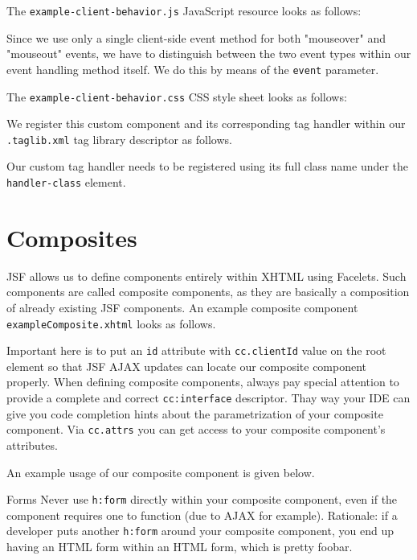 The \texttt{example-client-behavior.js} JavaScript resource looks as follows:

Since we use only a single client-side event method for both "mouseover" and "mouseout" events, we have to distinguish between the two event types within our event handling method itself.
We do this by means of the \texttt{event} parameter.

The \texttt{example-client-behavior.css} CSS style sheet looks as follows:


We register this custom component and its corresponding tag handler within our \texttt{.taglib.xml} tag library descriptor as follows.

Our custom tag handler needs to be registered using its full class name under the \texttt{handler-class} element.

\section{Composites}
JSF allows us to define components entirely within XHTML using Facelets.
Such components are called composite components, as they are basically a composition of already existing JSF components.
An example composite component \texttt{exampleComposite.xhtml} looks as follows.

Important here is to put an \texttt{id} attribute with \texttt{cc.clientId} value on the root element so that JSF AJAX updates can locate our composite component properly.
When defining composite components, always pay special attention to provide a complete and correct \texttt{cc:interface} descriptor.
Thay way your IDE can give you code completion hints about the parametrization of your composite component.
Via \texttt{cc.attrs} you can get access to your composite component's attributes.

An example usage of our composite component is given below.

\begin{TIP}{Forms}
Never use \texttt{h:form} directly within your composite component, even if the component requires one to function (due to AJAX for example).
Rationale: if a developer puts another \texttt{h:form} around your composite component, you end up having an HTML form within an HTML form, which is pretty foobar.
\end{TIP}

